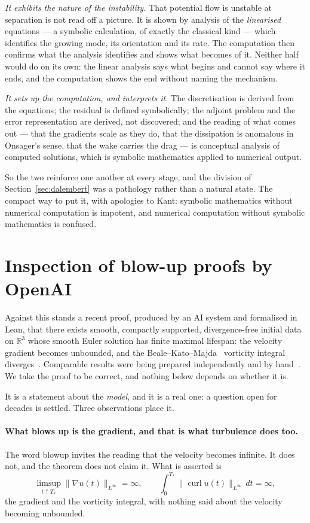 \documentclass[11pt]{article}
\newcommand{\grad}{\nabla}
\begin{document}
\emph{It exhibits the nature of the instability.} That potential flow is unstable at separation is
not read off a picture. It is shown by analysis of the \emph{linearised} equations --- a symbolic
calculation, of exactly the classical kind --- which identifies the growing mode, its orientation and
its rate. The computation then confirms what the analysis identifies and shows what becomes of it.
Neither half would do on its own: the linear analysis says what begins and cannot say where it ends,
and the computation shows the end without naming the mechanism.

\emph{It sets up the computation, and interprets it.} The discretisation is derived from the
equations; the residual is defined symbolically; the adjoint problem and the error representation are
derived, not discovered; and the reading of what comes out --- that the gradients scale as they do,
that the dissipation is anomalous in Onsager's sense, that the wake carries the drag --- is
conceptual analysis of computed solutions, which is symbolic mathematics applied to numerical output.

So the two reinforce one another at every stage, and the division of Section~\ref{sec:dalembert} was
a pathology rather than a natural state. The compact way to put it, with apologies to Kant: symbolic
mathematics without numerical computation is impotent, and numerical computation without symbolic
mathematics is confused.

\section{Inspection of blow-up proofs by OpenAI}\label{sec:openai}

Against this stands a recent proof, produced by an AI system and formalised in Lean, that there
exists smooth, compactly supported, divergence-free initial data on $\mathbb{R}^3$ whose smooth Euler
solution has finite maximal lifespan: the velocity gradient becomes unbounded, and the
Beale--Kato--Majda~\cite{bkm} vorticity integral diverges~\cite{openaieuler}. Comparable results were being
prepared independently and by hand~\cite{buckmaster}. We take the proof to be correct, and nothing
below depends on whether it is.

It is a statement about the \emph{model}, and it is a real one: a question open for decades is
settled. Three observations place it.

\paragraph{What blows up is the gradient, and that is what turbulence does too.} The word blowup
invites the reading that the velocity becomes infinite. It does not, and the theorem does not claim
it. What is asserted is
\[
\limsup_{t\uparrow T_*}\|\grad u(t)\|_{L^\infty}=\infty ,
\qquad
\int_0^{T_*}\|\operatorname{curl}u(t)\|_{L^\infty}\,dt=\infty ,
\]
the gradient and the vorticity integral, with nothing said about the velocity becoming unbounded.
\end{document}
